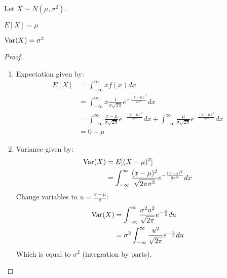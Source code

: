 \documentclass[../Main.tex]{subfiles}
\begin{document}
\begin{propositions}{
        Let $X \sim N(\mu, \sigma^2)$.
        \label{propsNormalMeanVar}
    }
    \item $E[X] = \mu$ \label{propNormalMean}
    \item $\operatorname{Var}(X) = \sigma^2$ \label{propNormalVar}
\end{propositions}
\begin{proof}
    \begin{enumerate}
        \item Expectation given by:
            \begin{align*}
                E[X] &= \int_{-\infty}^\infty xf(x) dx \\
                &= \int_{-\infty}^\infty x \frac{1}{\sigma \sqrt{2\pi}} e^{-\frac{(x - \mu)^2}{2\sigma^2}} dx \\
                &= \int_{-\infty}^\infty \frac{x - \mu}{\sigma \sqrt{2\pi}} e^{-\frac{(x - \mu)^2}{2\sigma^2}} dx + \int_{-\infty}^\infty \frac{\mu}{\sigma\sqrt{2\pi}} e^{-\frac{(x - \mu)^2}{2\sigma^2}} dx \\
                &= 0 + \mu
            \end{align*}
        \item Variance given by:
            \begin{align*}
                \operatorname{Var}(X) &= E[(X - \mu)^2] \\
                &= \int_{-\infty}^\infty \frac{(x - \mu)^2}{\sqrt{2\pi \sigma^2}} e^{-\frac{(x - \mu)^2}{2\sigma^2}} dx
            \end{align*}
            Change variables to $u = \frac{x - \mu}{\sigma}$:
            \begin{align*}
                \operatorname{Var}(X) &= \int_{-\infty}^\infty \frac{\sigma^2u^2}{\sqrt{2\pi}} e^{-\frac{u}{2}}du \\
                &= \sigma^2 \int_{-\infty}^\infty \frac{u^2}{\sqrt{2\pi}} e^{-\frac{u}{2}} du
            \end{align*}
            Which is equal to $\sigma^2$ (integration by parts).
    \end{enumerate}
\end{proof}
\end{document}
